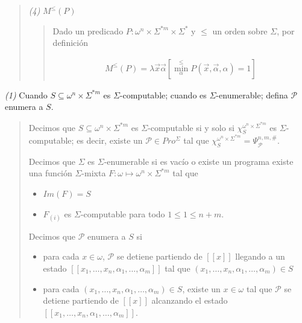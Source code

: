 \documentclass[a4paper, 12pt]{article}
\begin{document}
\begin{quote}
\begin{quote}
\end{quote}
\normalsize

\textit{(4)} $M^{\leq}(P)$


\small
\begin{quote}

Dado un predicado $P : \omega^{n} \times \Sigma^{*m} \times \Sigma^{*}$ y $\leq$
un orden sobre $\Sigma$, por definición 

\begin{align*}
    M^{\leq}(P) = \lambda \vec{x}\vec{\alpha} \left[ \min_{\alpha}^{\leq} P(\vec{x},
    \vec{\alpha}, \alpha) = 1  \right]
\end{align*}

\end{quote}
\normalsize



\end{quote}
\normalsize

\pagebreak 

\textit{(1)} Cuando $S \subseteq \omega^{n} \times \Sigma^{*m} $ es
$\Sigma$-computable; cuando es $\Sigma$-enumerable; defina $\mathcal{P}$ enumera
a $S$.


\small
\begin{quote}

Decimos que $S \subseteq \omega^{n} \times \Sigma^{*m} $ es $\Sigma$-computable
si y solo si $\chi_{S}^{\omega^{n} \times \Sigma^{*m} }$ es $\Sigma$-computable;
es decir, existe un $\mathcal{P} \in Pro^{\Sigma}$ tal que $\chi_{S}^{\omega^{n}
\times \Sigma^{*m} } = \Psi_{\mathcal{P}}^{n, m, \#} $.

Decimos que $\Sigma$ es $\Sigma$-enumerable si es vacío o existe un programa
existe una función $\Sigma$-mixta $F : \omega \mapsto \omega^{n} \times
\Sigma^{*m} $ tal que 

\begin{itemize}
    \item $Im(F) = S$ 
    \item $F_{(i)}$ es $\Sigma$-computable para todo $1 \leq 1 \leq n + m$.
\end{itemize}

Decimos que $\mathcal{P}$ enumera a $S$ si 

\begin{itemize}
    \item para cada $x \in  \omega$,
$\mathcal{P}$ se detiene partiendo de $[\![ x ]\!]$ llegando a un estado $[\![
x_1, \ldots, x_n, \alpha_1, \ldots, \alpha_m ]\!]$ tal que $(x_1, \ldots, x_n,
\alpha_1, \ldots, \alpha_m) \in S$ 
    \item para cada $(x_1, \ldots, x_n, \alpha_1, \ldots, \alpha_m) \in S$,
        existe un $x \in \omega$ tal que $\mathcal{P}$ se detiene partiendo de
        $[\![ x ]\!]$ alcanzando el estado $[\![ x_1, \ldots, x_n, \alpha_1,
        \ldots, \alpha_m ]\!]$.
\end{itemize}


\end{quote}
\normalsize
\end{document}

